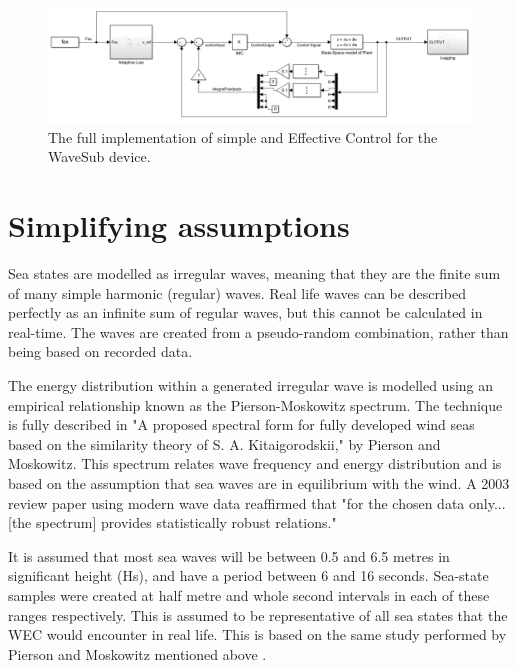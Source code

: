 \documentclass{report}
\begin{document}
\begin{figure}[t]
\hspace{-2cm}
\includegraphics[scale=0.6]{graphics/fullControlSystem}
\caption{The full implementation of simple and Effective Control for the WaveSub device.}
\label{fig:fullControl}
\end{figure}

\FloatBarrier


\section{Simplifying assumptions}
\label{section:assumptions}

Sea states are modelled as irregular waves, meaning that they are the finite sum of many simple harmonic (regular) waves. Real life waves can be described perfectly as an infinite sum of regular waves, but this cannot be calculated in real-time. The waves are created from a pseudo-random combination, rather than being based on recorded data.

The energy distribution within a generated irregular wave is modelled using an empirical relationship known as the Pierson-Moskowitz spectrum. The technique is fully described in "A proposed spectral form for fully developed wind seas based on the similarity theory of S. A. Kitaigorodskii," by Pierson and Moskowitz\cite{OGPM}. This spectrum relates wave frequency and energy distribution and is based on the assumption that sea waves are in equilibrium with the wind. A 2003 review paper using modern wave data reaffirmed that "for the chosen data only... [the spectrum] provides statistically robust relations."\cite{PMReview}

It is assumed that most sea waves will be between 0.5 and 6.5 metres in significant height (Hs), and have a period between 6 and 16 seconds. Sea-state samples were created at half metre and whole second intervals in each of these ranges respectively. This is assumed to be representative of all sea states that the WEC would encounter in real life. This is based on the same study performed by Pierson and Moskowitz mentioned above \cite{OGPM}.
\end{document}
